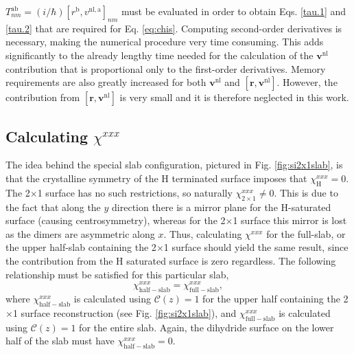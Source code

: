 $T^{\mathrm{a}\mathrm{b}}_{nm}=(i/\hbar)
[r^\mathrm{b},v^{\mathrm{nl},\mathrm{a}}]_{nm}$ must be evaluated in order to
obtain Eqs. \eqref{tau.1} and \eqref{tau.2} that are required for Eq.
\eqref{eq:chis}. Computing second-order derivatives is necessary, making the
numerical procedure very time consuming. This adds significantly to the already
lengthy time needed for the calculation of the $\mathbf{v}^\mathrm{nl}$
contribution that is proportional only to the first-order derivatives. Memory
requirements are also greatly increased for both $\mathbf{v}^\mathrm{nl}$ and
$[\mathbf{r},\mathbf{v}^\mathrm{nl}]$. However, the contribution from
$[\mathbf{r},\mathbf{v}^\mathrm{nl}]$ is very small \cite{valerie} and it is
therefore neglected in this work.



\subsection{Calculating \texorpdfstring{$\chi^{xxx}$}{Xxxx}}
\label{sec:res2x1chi}

The idea behind the special slab configuration, pictured in Fig.
\ref{fig:si2x1slab}, is that the crystalline symmetry of the H terminated
surface imposes that $\chi_{\mathrm{H}}^{xxx}=0$. The 2$\times$1 surface has no
such restrictions, so naturally $\chi_{2\times 1}^{xxx}\ne 0$. This is due to
the fact that along the $y$ direction there is a mirror plane for the
H-saturated surface (causing centrosymmetry), whereas for the 2$\times$1 surface
this mirror is lost as the dimers are asymmetric along $x$. Thus, calculating
$\chi^{xxx}$ for the full-slab, or the upper half-slab containing the 2$\times$1
surface \cite{note1} should yield the same result, since the contribution from
the H saturated surface is zero regardless. The following relationship must be
satisfied for this particular slab,
\begin{equation*}
\chi_{\mathrm{half-slab}}^{xxx} =
\chi_{\mathrm{full-slab}}^{xxx},
\end{equation*}
where $\chi_{\mathrm{half-slab}}^{xxx}$ is calculated using
${\mathbf{\mathcal{C}}}(z) = 1$ for the upper half containing the 2$\times$1
surface reconstruction (see Fig. \ref{fig:si2x1slab}), and
$\chi_{\mathrm{full-slab}}^{xxx}$ is calculated using ${\mathbf{\mathcal{C}}}(z)
= 1$ for the entire slab. Again, the dihydride surface on the lower half of the
slab must have $\chi_{\mathrm{half-slab}}^{xxx} = 0$.

